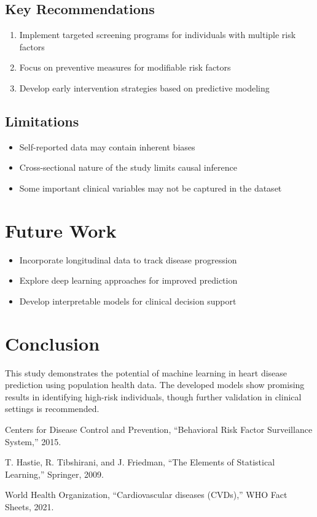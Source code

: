 \documentclass[conference]{IEEEtran}
\begin{document}
\subsection{Key Recommendations}
\begin{enumerate}
    \item Implement targeted screening programs for individuals with multiple risk factors
    \item Focus on preventive measures for modifiable risk factors
    \item Develop early intervention strategies based on predictive modeling
\end{enumerate}

\subsection{Limitations}
\begin{itemize}
    \item Self-reported data may contain inherent biases
    \item Cross-sectional nature of the study limits causal inference
    \item Some important clinical variables may not be captured in the dataset
\end{itemize}

\section{Future Work}
\begin{itemize}
    \item Incorporate longitudinal data to track disease progression
    \item Explore deep learning approaches for improved prediction
    \item Develop interpretable models for clinical decision support
\end{itemize}

\section{Conclusion}
This study demonstrates the potential of machine learning in heart disease prediction using population health data. The developed models show promising results in identifying high-risk individuals, though further validation in clinical settings is recommended.

\begin{thebibliography}{1}
Centers for Disease Control and Prevention, ``Behavioral Risk Factor Surveillance System,'' 2015.

T. Hastie, R. Tibshirani, and J. Friedman, ``The Elements of Statistical Learning,'' Springer, 2009.

World Health Organization, ``Cardiovascular diseases (CVDs),'' WHO Fact Sheets, 2021.
\end{thebibliography}
\end{document}
